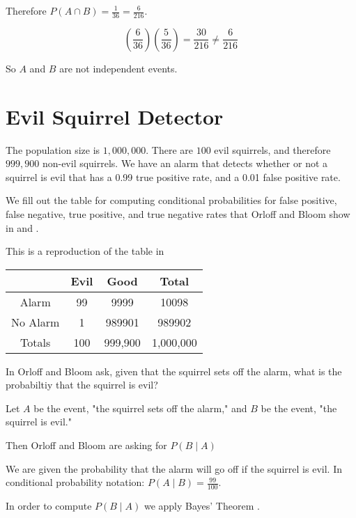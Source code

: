 \documentclass[a4paper,11pt]{article}
\begin{document}
Therefore $P\left( A \cap B \right) = \frac{1}{36} = \frac{6}{216}$.

\begin{equation}
  \left( \frac{6}{36} \right) \left( \frac{5}{36} \right) =
    \frac {30}{216} \neq \frac{6}{216}
\end{equation}

So $A$ and $B$ are not independent events.

\section{Evil Squirrel Detector}

The population size is $1,000,000$.  There are $100$ evil squirrels,
and therefore $999,900$ non-evil squirrels. We have an alarm that
detects whether or not a squirrel is evil that has a 0.99 true positive
rate, and a 0.01 false positive rate.

We fill  out the table for computing conditional probabilities for
false positive, false negative, true positive, and true negative rates
that Orloff and Bloom show in \cite{slides3} and \cite{reading3}.

This is a reproduction of the table in \cite{slides3}
\begin{center}
  \begin{tabular}{ | c | c | c | c |}
    \hline
              & Evil  & Good    & Total     \\ \hline
    Alarm     & 99    & 9999    & 10098     \\ \hline
    No Alarm  & 1     & 989901  & 989902    \\ \hline
    Totals    & 100   & 999,900 & 1,000,000 \\ \hline
  \end{tabular}
\end{center}

In \cite{slides3}  Orloff and Bloom ask, given that the squirrel sets
off the alarm, what is the probabiltiy that the squirrel is evil?

Let $A$ be the event, "the squirrel sets off the alarm," and $B$ be
the event, "the squirrel is evil."

Then Orloff and Bloom are asking for $P \left( B \mid A \right)$

We are given the probability that the alarm will go off if the squirrel
is evil.  In conditional probability notation: 
$P \left( A \mid B \right) = \frac{99}{100}$.

In order to compute $P \left( B \mid A \right)$ we apply Bayes' Theorem
\cite{reading3}.
\end{document}
